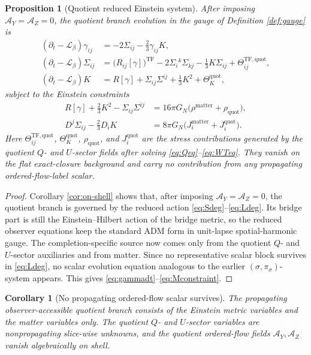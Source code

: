 \documentclass[11pt]{article}
\newcommand{\AY}{\mathcal A_Y}
\newcommand{\AZ}{\mathcal A_Z}
\newcommand{\Ell}{\mathcal{L}}
\newtheorem{proposition}{Proposition}
\newtheorem{corollary}{Corollary}
\begin{document}
\begin{proposition}[Quotient reduced Einstein system]
\label{prop:reduced}
After imposing \(\AY=\AZ=0\), the quotient branch evolution in the gauge of Definition \ref{def:gauge} is
\begin{align}
(\partial_t-\Ell_\beta)\gamma_{ij}
&=
-2\Sigma_{ij}-\frac23\gamma_{ij}K,
\label{eq:gammadt}
\\
(\partial_t-\Ell_\beta)\Sigma_{ij}
&=
\bigl(R_{ij}[\gamma]\bigr)^{\mathrm{TF}}
-2\Sigma_i{}^k\Sigma_{kj}
-\frac13K\Sigma_{ij}
+\Theta_{ij}^{\mathrm{TF,quot}},
\label{eq:Sigmadt}
\\
(\partial_t-\Ell_\beta)K
&=
R[\gamma]+\Sigma_{ij}\Sigma^{ij}+\frac13K^2+\Theta_K^{\mathrm{quot}},
\label{eq:Kdt}
\end{align}
subject to the Einstein constraints
\begin{align}
R[\gamma]+\frac23K^2-\Sigma_{ij}\Sigma^{ij}
&=
16\pi G_N\bigl(\rho^{\mathrm{matter}}+\rho_{\mathrm{quot}}\bigr),
\label{eq:Hconstraint}
\\
D^j\Sigma_{ij}-\frac23D_iK
&=
8\pi G_N\bigl(J_i^{\mathrm{matter}}+J_i^{\mathrm{quot}}\bigr).
\label{eq:Mconstraint}
\end{align}
Here \(\Theta_{ij}^{\mathrm{TF,quot}}\), \(\Theta_K^{\mathrm{quot}}\), \(\rho_{\mathrm{quot}}\), and \(J_i^{\mathrm{quot}}\) are the stress contributions generated by the quotient \(Q\)- and \(U\)-sector fields after solving \eqref{eq:Qeq}--\eqref{eq:WTeq}. They vanish on the flat exact-closure background and carry no contribution from any propagating ordered-flow-label scalar.
\end{proposition}

\begin{proof}
Corollary \ref{cor:on-shell} shows that, after imposing \(\AY=\AZ=0\), the quotient branch is governed by the reduced action \eqref{eq:Sdeg}--\eqref{eq:Ldeg}. Its bridge part is still the Einstein--Hilbert action of the bridge metric, so the reduced observer equations keep the standard ADM form in unit-lapse spatial-harmonic gauge. The completion-specific source now comes only from the quotient \(Q\)- and \(U\)-sector auxiliaries and from matter. Since no representative scalar block survives in \eqref{eq:Ldeg}, no scalar evolution equation analogous to the earlier \((\sigma,\pi_\sigma)\)-system appears. This gives \eqref{eq:gammadt}--\eqref{eq:Mconstraint}.
\end{proof}

\begin{corollary}[No propagating ordered-flow scalar survives]
\label{cor:noscalar}
The propagating observer-accessible quotient branch consists of the Einstein metric variables and the matter variables only. The quotient \(Q\)- and \(U\)-sector variables are nonpropagating slice-wise unknowns, and the quotient ordered-flow fields \(\AY,\AZ\) vanish algebraically on shell.
\end{corollary}
\end{document}
